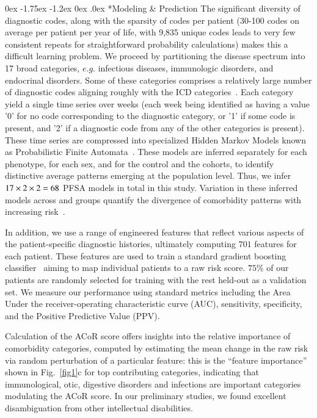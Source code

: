 \documentclass[onecolumn, compsoc,11pt]{IEEEtran}
\makeatletter
\renewcommand\subsection{\@startsection {subsection}{2}{\z@}%
                                   {0ex \@plus -1.75ex \@minus -1.2ex}%
                                   {0ex \@plus.0ex}%
                                   {\fontsize{11}{11}\selectfont\bfseries\sffamily\color{black}}}
\def\DXphn{17}%
\def\numfeatures{701\xspace}%
\def\acor{ACoR\xspace}
\makeatother
\begin{document}
\subsection*{Modeling \& Prediction}
The significant diversity of diagnostic codes, along with the sparsity of codes per patient (30-100 codes on average  per patient per year of life, with 9,835 unique codes leads to very few consistent repeats for straightforward  probability calculations)   makes this a difficult learning problem. 
We proceed by  partitioning the  disease spectrum into \DXphn\xspace broad  categories, $e.g.$ infectious diseases, immunologic disorders, and endocrinal disorders. Some of these categories comprises a relatively large number of diagnostic codes aligning roughly with the  ICD categories~\cite{hedegaard2019international}.   Each  category yield a single time series over weeks (each week being identified as having a value '0' for no code corresponding to the diagnostic category, or  '1' if some code is present, and '2' if a diagnostic code from any of the other categories is present). 
These time series are  compressed into specialized Hidden Markov Models known as Probabilistic Finite Automata~\cite{CL12g,Chattopadhyay20140826}. These models are inferred separately for each phenotype,  for each sex, and for the control and the \treatment cohorts,  to identify   distinctive average patterns  emerging at the population level. Thus, we infer 
$\DXphn\times 2 \times 2  = \the\numexpr  \DXphn  *2 *2  \relax$  PFSA models in total in this study. Variation in these inferred models across \treatment and \control groups  quantify the divergence of comorbidity patterns with increasing risk~\cite{huang2019data}. 

In addition, we use a range of engineered features that reflect various aspects of the patient-specific diagnostic histories, ultimately computing   $\numfeatures$  features    for each patient. These features are  used to train a standard gradient boosting classifier~\cite{ke2017lightgbm} aiming to  map   individual patients  to a raw risk score. $75\%$ of our patients are randomly selected for training with the rest  held-out as a validation set. We measure our performance using  standard metrics including the Area Under the receiver-operating characteristic curve (AUC), sensitivity, specificity, and  the Positive Predictive Value (PPV).

Calculation of the \acor score offers  insights into the relative importance of  comorbidity categories, computed  by estimating the  mean change in the raw risk via random perturbation of a particular feature: this is the ``feature importance'' shown in Fig.~\ref{fig1}c for top contributing  categories, indicating that immunological, otic, digestive disorders and infections  are   important categories  modulating the \acor score. In our preliminary studies, we  found excellent disambiguation from other intellectual disabilities.
\end{document}
